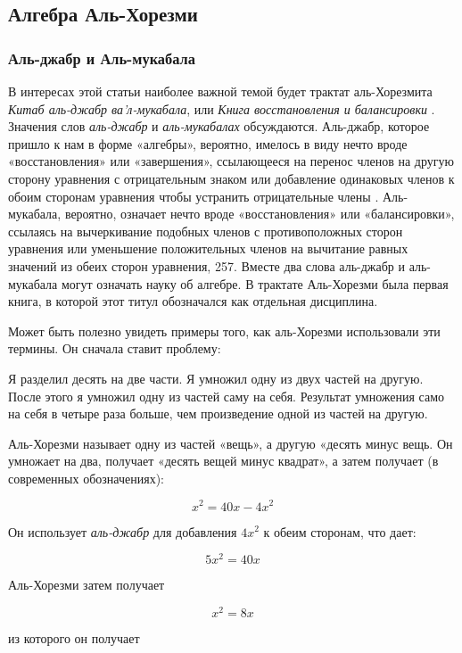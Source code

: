 \subsection{Алгебра Аль-Хорезми}
\subsubsection{Аль-джабр и Аль-мукабала}
В интересах этой статьи наиболее важной темой будет трактат аль-Хорезмита \textit{Китаб аль-джабр ва'л-мукабала}, или \textit{Книга восстановления и балансировки} \cite{boyer}. Значения слов \textit{аль-джабр} и \textit{аль-мукабалах} обсуждаются. Аль-джабр, которое пришло к нам в форме «алгебры», вероятно, имелось в виду нечто вроде «восстановления» или «завершения», ссылающееся на перенос членов на другую сторону уравнения с отрицательным знаком или добавление одинаковых членов к обоим сторонам уравнения чтобы устранить отрицательные члены \cite{boyer}. Аль-мукабала, вероятно, означает нечто вроде «восстановления» или «балансировки», ссылаясь на вычеркивание подобных членов с противоположных сторон уравнения или уменьшение положительных членов на вычитание равных значений из обеих сторон уравнения\cite{boyer}, 257. Вместе два слова аль-джабр и аль-мукабала могут означать науку об алгебре. В трактате Аль-Хорезми была первая книга, в которой этот титул обозначался как отдельная дисциплина.

Может быть полезно увидеть примеры того, как аль-Хорезми использовали эти термины. Он сначала ставит проблему:

\begin{displayquote}
Я разделил десять на две части. Я умножил одну из двух частей на другую. После этого я умножил одну из частей саму на себя. Результат умножения само на себя в четыре раза больше, чем произведение одной из частей на другую.\cite{vanderwaer}
\end{displayquote}

Аль-Хорезми называет одну из частей «вещь», а другую «десять минус вещь. Он умножает на два, получает «десять вещей минус квадрат», а затем получает (в современных обозначениях):

$$x^2 = 40x - 4x^2$$

Он использует \textit{аль-джабр} для добавления $4x^2$ к обеим сторонам, что дает:

$$5x^2 = 40x$$

Аль-Хорезми затем получает

$$x^2 = 8x$$

из которого он получает

